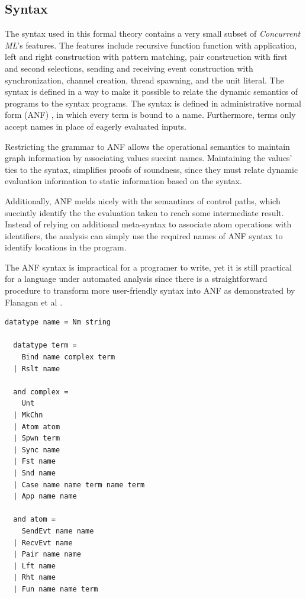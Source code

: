 \documentclass[10pt]{article}
\begin{document}
\subsection{Syntax}
The syntax used in this formal theory contains a very small subset of
\textit{Concurrent ML}'s features. The features include recursive function function with
application, left and right construction with pattern matching, pair construction with first
and second selections, sending and receiving event construction with synchronization,
channel creation, thread spawning, and the unit literal. The syntax is defined in a way to
make it possible to relate the dynamic semantics of programs to the syntax programs.
The syntax is defined in administrative normal form (ANF) \cite{}, in which every term
is bound to a name. Furthermore, terms only accept names in place of eagerly evaluated
inputs. 

Restricting the grammar to ANF allows the operational semantics
to maintain graph information by associating values succint names.
Maintaining the values' ties to the syntax,
simplifies proofs of soundness, since they must relate dynamic evaluation information
to static information based on the syntax.

Additionally, ANF melds nicely with the semantincs of control paths, which succintly identify
the the evaluation taken to reach some intermediate result.
Instead of relying on additional meta-syntax to associate atom operations with identifiers,
the analysis can simply use the required names of ANF syntax to identify locations in the program.

The ANF syntax is impractical for a programer to write,
yet it is still practical for a language under automated analysis
since there is a straightforward procedure to transform
more user-friendly syntax into ANF as demonstrated by Flanagan et al \cite{}.


\begin{lstlisting}[language=logic]
  datatype name = Nm string

  datatype term = 
    Bind name complex term 
  | Rslt name

  and complex = 
    Unt
  | MkChn
  | Atom atom
  | Spwn term 
  | Sync name
  | Fst name
  | Snd name
  | Case name name term name term 
  | App name name

  and atom = 
    SendEvt name name
  | RecvEvt name
  | Pair name name
  | Lft name
  | Rht name
  | Fun name name term 
\end{lstlisting}
\end{document}

